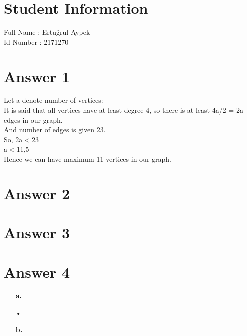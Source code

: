 \documentclass[11pt]{article}
\begin{document}
	
\section*{Student Information } 
Full Name : Ertuğrul Aypek  \\
Id Number : 2171270 \\

\section*{Answer 1}
Let a denote number of vertices: \\
It is said that all vertices have at least degree 4, so there is at least 4a/2 = 2a edges in our graph. \\
And number of edges is given 23. \\
So, 2a$<$23 \\
a$<$11,5 \\
Hence we can have maximum 11 vertices in our graph.

\section*{Answer 2}


\section*{Answer 3}


\section*{Answer 4}
\begin{itemize}
	\item[\textbf{a.}]
	\begin{tabular}{•}
	
	\end{tabular}
	
	
	 
	\item[\textbf{b.}] 
\end{itemize}
\end{document}
